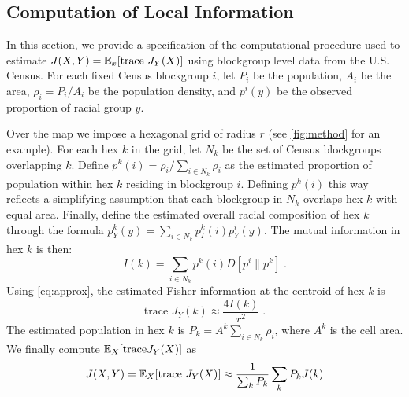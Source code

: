 \subsection*{Computation of Local Information}
	In this section, we provide a specification of the computational procedure used to estimate $J(X,Y) = \mathbb{E}_x[\text{trace } J_Y(X)]$ using blockgroup level data from the U.S. Census. For each fixed Census blockgroup $i$, let $P_i$ be the population, $A_i$ be the area, $\rho_i = P_i / A_i$ be the population density, and $p^i(y)$ be the observed proportion of racial group $y$. 

	Over the map we impose a hexagonal grid of radius $r$ (see \ref{fig:method} for an example). For each hex $k$ in the grid, let $N_k$ be the set of Census blockgroups overlapping $k$. Define $p^{k}(i) = \rho_i / \sum_{i \in N_k} \rho_i$ as the estimated proportion of population within hex $k$ residing in blockgroup $i$. Defining $p^k(i)$ this way reflects a simplifying assumption that each blockgroup in $N_k$ overlaps hex $k$ with equal area. Finally, define the estimated overall racial composition of hex $k$ through the formula $p^k_Y(y) = \sum_{i \in N_k} p^{k}_I(i) p^i_Y(y)$. The mutual information in hex $k$ is then: 
	\begin{equation}
		I(k) = \sum_{i \in N_k} p^k(i) D[p^i \| p^k]\;. 
	\end{equation}
	Using \eqref{eq:approx}, the estimated Fisher information at the centroid of hex $k$ is 
	\begin{equation}
		\text{trace } J_Y(k) \approx \frac{4 I(k)}{r^2}\;.
	\end{equation}
	The estimated population in hex $k$ is $P_k = A^k\sum_{i \in N_k} \rho_i$, where $A^k$ is the cell area. We finally compute $\mathbb{E}_X[\text{trace} J_Y(X)]$ as 
	\begin{equation}
		J(X,Y) = \mathbb{E}_X[\text{trace }J_Y(X)] \approx \frac{1}{\sum_k P_k} \sum_k P_k J(k)
	\end{equation}
